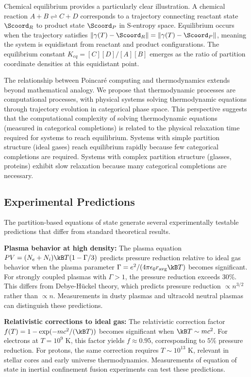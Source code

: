 Chemical equilibrium provides a particularly clear illustration. A chemical reaction $A + B \rightleftharpoons C + D$ corresponds to a trajectory connecting reactant state $\Scoord_R$ to product state $\Scoord_P$ in S-entropy space. Equilibrium occurs when the trajectory satisfies $\|\gamma(T) - \Scoord_R\| = \|\gamma(T) - \Scoord_P\|$, meaning the system is equidistant from reactant and product configurations. The equilibrium constant $K_{eq} = [C][D]/[A][B]$ emerges as the ratio of partition coordinate densities at this equidistant point.

The relationship between Poincaré computing and thermodynamics extends beyond mathematical analogy. We propose that thermodynamic processes are computational processes, with physical systems solving thermodynamic equations through trajectory evolution in categorical phase space. This perspective suggests that the computational complexity of solving thermodynamic equations (measured in categorical completions) is related to the physical relaxation time required for systems to reach equilibrium. Systems with simple partition structure (ideal gases) reach equilibrium rapidly because few categorical completions are required. Systems with complex partition structure (glasses, proteins) exhibit slow relaxation because many categorical completions are necessary.

\subsection{Experimental Predictions}

The partition-based equations of state generate several experimentally testable predictions that differ from standard theoretical results.

\textbf{Plasma behavior at high density:} The plasma equation $PV = (N_e + N_i)\kB T(1 - \Gamma/3)$ predicts pressure reduction relative to ideal gas behavior when the plasma parameter $\Gamma = e^2/(4\pi\epsilon_0 r_{\text{avg}} \kB T)$ becomes significant. For strongly coupled plasmas with $\Gamma > 1$, the pressure reduction exceeds $30\%$. This differs from Debye-Hückel theory, which predicts pressure reduction $\propto n^{3/2}$ rather than $\propto n$. Measurements in dusty plasmas and ultracold neutral plasmas can distinguish these predictions.

\textbf{Relativistic corrections to ideal gas:} The relativistic correction factor $f(T) = 1 - \exp(-mc^2/(\kB T))$ becomes significant when $\kB T \sim mc^2$. For electrons at $T = 10^9$ K, this factor yields $f \approx 0.95$, corresponding to $5\%$ pressure reduction. For protons, the same correction requires $T \sim 10^{13}$ K, relevant in stellar cores and early universe thermodynamics. Measurements of equation of state in inertial confinement fusion experiments can test these predictions.

